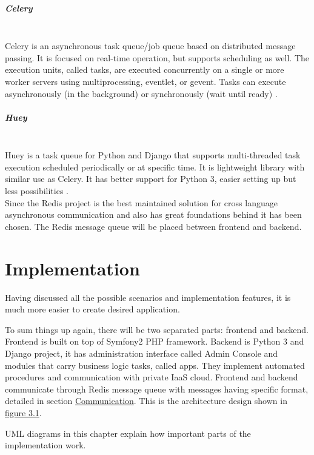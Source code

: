 \documentclass[thesis=B,english]{FITthesis}[2013/04/26]
\newcommand{\myparagraph}[1]{\paragraph{#1}\mbox{}\\}
\begin{document}
\myparagraph{Celery}

Celery is an asynchronous task queue/job queue based on distributed message passing. It is focused on real-time operation, but supports scheduling as well. The execution units, called tasks, are executed concurrently on a single or more worker servers using multiprocessing, eventlet, or gevent. Tasks can execute asynchronously (in the background) or synchronously (wait until ready) \cite{celery}.

\myparagraph{Huey}

Huey is a task queue for Python and Django that supports multi-threaded task execution scheduled periodically or at specific time. It is lightweight library with similar use as Celery. It has better support for Python 3, easier setting up but less possibilities \cite{huey}. \\

Since the Redis project is the best maintained solution for cross language asynchronous communication and also has great foundations behind it has been chosen. The Redis message queue will be placed between frontend and backend.


\chapter{Implementation}
\label{chapter:implementation}

Having discussed all the possible scenarios and implementation features, it is much more easier to create desired application.

To sum things up again, there will be two separated parts: frontend and backend. Frontend is built on top of Symfony2 PHP framework. Backend is Python 3 and Django project, it has administration interface called Admin Console and modules that carry business logic tasks, called apps. They implement automated procedures and communication with private IaaS cloud. Frontend and backend communicate through Redis message queue with messages having specific format, detailed in section \hyperref[section:communication]{Communication}. This is the architecture design shown in \hyperref[TODO]{figure 3.1}.

UML diagrams in this chapter explain how important parts of the implementation work.
\end{document}
